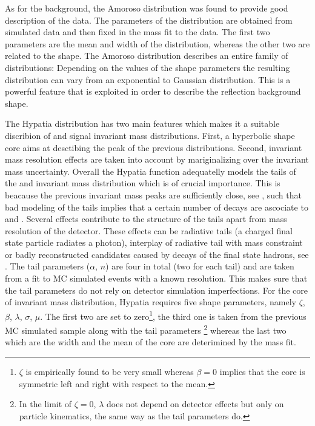 As for the \LbJpsippi background, the Amoroso distribution was found to provide  good description of the data.
The parameters of the distribution are obtained from simulated data and then fixed in the mass fit to the data. The first two parameters
are the mean and width of the distribution, whereas the other two are related to the shape. The Amoroso distribution describes
an entire family of distributions: Depending on the values of the shape parameters the resulting distribution can vary from an exponential
to Gaussian distribution. This is a powerful feature that is exploited in order to describe the \LbJpsippi reflection background shape.

The Hypatia distribution has two main features which makes it a suitable discribion of \Bs and \Bd signal invariant mass distributions.
First, a hyperbolic shape core aims at desctibing the peak of the previous distributions. Second, invariant mass resolution effects are
taken into account by mariginalizing over the \Bq invariant mass uncertainty. Overall the Hypatia function adequatelly
models the tails of the \Bs and \Bd invariant mass distribution which is of crucial importance. This is beacause the previous invariant
mass peaks are sufficiently close, see , such that bad modeling of the tails implies that a certain number of \Bd decays
are ascociate to \Bs and \viceversa. Several effects contribute to the structure of the tails apart
from mass resolution of the detector. These effects can be radiative tails (a charged final state particle radiates a photon), interplay of
radiative tail with \jpsi mass constraint or badly reconstructed candidates caused by decays of the final state hadrons, see \cite{Santos:2013gra}.
The tail parameters ($\alpha$, $n$) are four in total (two for each tail) and are taken from a fit to MC simulated events with a known resolution.
This makes sure that the tail parameters do not rely on detector simulation imperfections.
For the core of invariant mass distribution, Hypatia requires five shape parameters, namely $\zeta$, $\beta$, $\lambda$, $\sigma$, $\mu$.
The first two are set to zero\footnote{$\zeta$ is empirically found to be very small whereas
$\beta = 0$ implies that the core is symmetric left and right with respect to the mean.}, the third one is taken from the previous
MC simulated sample along with the tail parameters \footnote{In the limit of $\zeta = 0$, $\lambda$ does not depend on detector
effects but only on particle kinematics, the same way as the tail parameters do.} whereas the last two which are the width and
the mean of the core are deterimined by the mass fit.

